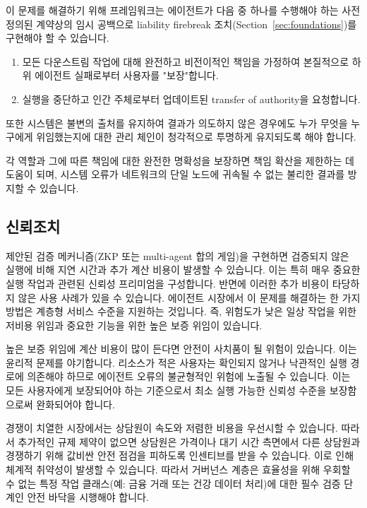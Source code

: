 \documentclass[11pt, a4paper, twocolumn, copyright, goog]{google}
\begin{document}
이 문제를 해결하기 위해 프레임워크는 에이전트가 다음 중 하나를 수행해야 하는 사전 정의된 계약상의 임시 공백으로 liability firebreak 조치(Section~\ref{sec:foundations})를 구현해야 할 수 있습니다.
\begin{enumerate}
    \item 모든 다운스트림 작업에 대해 완전하고 비전이적인 책임을 가정하여 본질적으로 하위 에이전트 실패로부터 사용자를 "보장"합니다.
    \item 실행을 중단하고 인간 주체로부터 업데이트된 transfer of authority을 요청합니다.
\end{enumerate}

또한 시스템은 불변의 출처를 유지하여 결과가 의도하지 않은 경우에도 누가 무엇을 누구에게 위임했는지에 대한 관리 체인이 청각적으로 투명하게 유지되도록 해야 합니다.

각 역할과 그에 따른 책임에 대한 완전한 명확성을 보장하면 책임 확산을 제한하는 데 도움이 되며, 시스템 오류가 네트워크의 단일 노드에 귀속될 수 없는 불리한 결과를 방지할 수 있습니다.

\subsection{신뢰조치}

제안된 검증 메커니즘(ZKP 또는 multi-agent 합의 게임)을 구현하면 검증되지 않은 실행에 비해 지연 시간과 추가 계산 비용이 발생할 수 있습니다. 이는 특히 매우 중요한 실행 작업과 관련된 신뢰성 프리미엄을 구성합니다. 반면에 이러한 추가 비용이 타당하지 않은 사용 사례가 있을 수 있습니다. 에이전트 시장에서 이 문제를 해결하는 한 가지 방법은 계층형 서비스 수준을 지원하는 것입니다. 즉, 위험도가 낮은 일상 작업을 위한 저비용 위임과 중요한 기능을 위한 높은 보증 위임이 있습니다.

높은 보증 위임에 계산 비용이 많이 든다면 안전이 사치품이 될 위험이 있습니다. 이는 윤리적 문제를 야기합니다. 리소스가 적은 사용자는 확인되지 않거나 낙관적인 실행 경로에 의존해야 하므로 에이전트 오류의 불균형적인 위험에 노출될 수 있습니다. 이는 모든 사용자에게 보장되어야 하는 기준으로서 최소 실행 가능한 신뢰성 수준을 보장함으로써 완화되어야 합니다.

경쟁이 치열한 시장에서는 상담원이 속도와 저렴한 비용을 우선시할 수 있습니다. 따라서 추가적인 규제 제약이 없으면 상담원은 가격이나 대기 시간 측면에서 다른 상담원과 경쟁하기 위해 값비싼 안전 점검을 피하도록 인센티브를 받을 수 있습니다. 이로 인해 체계적 취약성이 발생할 수 있습니다. 따라서 거버넌스 계층은 효율성을 위해 우회할 수 없는 특정 작업 클래스(예: 금융 거래 또는 건강 데이터 처리)에 대한 필수 검증 단계인 안전 바닥을 시행해야 합니다.
\end{document}
